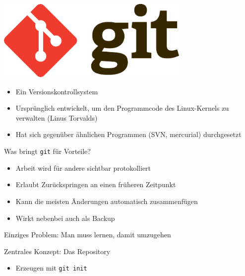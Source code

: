 \begin{frame}
    \centering
    \includegraphics[width=0.7\textwidth]{logos/git.pdf}

    \vspace{1em}

    \begin{itemize}
      \item Ein Versionskontrollsystem
      \item Ursprünglich entwickelt, um den Programmcode des Linux-Kernels zu verwalten (Linus Torvalds)
      \item Hat sich gegenüber ähnlichen Programmen (SVN, mercurial) durchgesetzt
    \end{itemize}
\end{frame}

\begin{frame}{Was bringt \texttt{git} für Vorteile?}
  \begin{itemize}
    \item Arbeit wird für andere sichtbar protokolliert
    \item Erlaubt Zurückspringen an einen früheren Zeitpunkt
    \item Kann die meisten Änderungen automatisch zusammenfügen
    \item Wirkt nebenbei auch als Backup
  \end{itemize}
  Einziges Problem: Man muss lernen, damit umzugehen
\end{frame}

\begin{frame}{Zentrales Konzept: Das Repository}
  \begin{itemize}
    \item Erzeugen mit \texttt{git init}
  \end{itemize}
  \vspace{3em}
  \centering
\end{frame}

